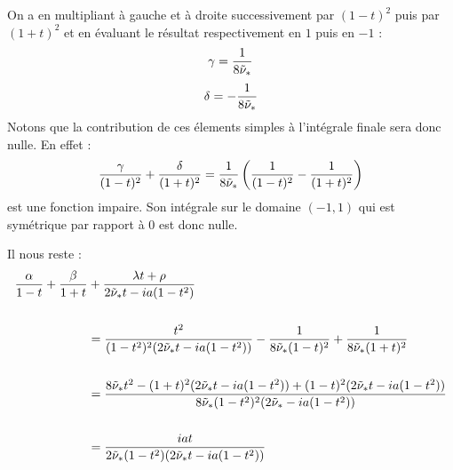 On a en multipliant à gauche et à droite successivement par $(1-t)^2$ puis par $(1+t)^2$ et en évaluant le résultat respectivement en $1$ puis en $-1$ :
$$ \gamma=\frac{1}{8\tilde{\nu}_*} $$
$$\delta = -\frac{1}{8\tilde{\nu}_*} $$
Notons que la contribution de ces élements simples à l'intégrale finale sera donc nulle. En effet :
$$ \frac{\gamma}{(1-t)^2}+\frac{\delta}{(1+t)^2}=\frac{1}{8\tilde{\nu}_*}\left( \frac{1}{(1-t)^2}-\frac{1}{(1+t)^2}\right) $$
est une fonction impaire. Son intégrale sur le domaine $ (-1,1)$ qui est symétrique par rapport à 0 est donc nulle.

Il nous reste :
\begin{equation*}
\begin{split}
\frac{\alpha}{1-t}+\frac{\beta}{1+t}&+ \frac{\lambda t + \rho }{2\tilde{\nu}_* t-ia(1-t^2)}\\  
~\\
&=\frac{t^2}{(1-t^2)^2(2\tilde{\nu}_* t -ia(1-t^2))}-\frac{1}{8\tilde{\nu}_*(1-t)^2}+\frac{1}{8\tilde{\nu}_*(1+t)^2}  \\
~\\
&=\frac{8\tilde{\nu}_*t^2-(1+t)^2(2\tilde{\nu}_*t-ia(1-t^2))+(1-t)^2(2\tilde{\nu}_*t-ia(1-t^2))}{8\tilde{\nu}_*(1-t^2)^2(2\tilde{\nu}_*-ia(1-t^2))}\\
~\\
&=\frac{iat}{2\tilde{\nu}_*(1-t^2)(2\tilde{\nu}_*t-ia(1-t^2))}
\end{split}
\end{equation*}

